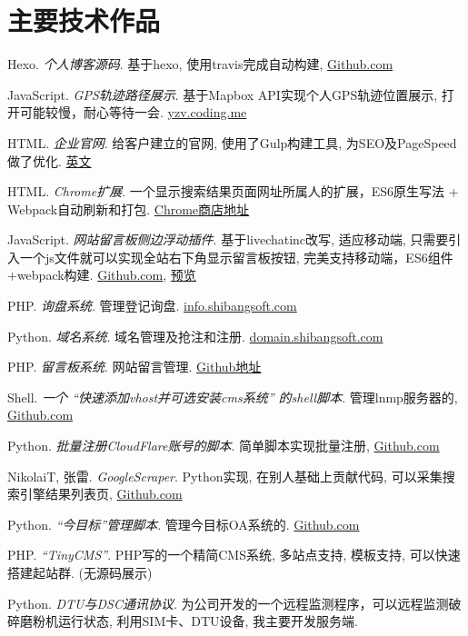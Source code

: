 
\section{\textbf{主要技术作品}}
 \resumeSubHeadingListStart
    \item{
       Hexo.
       \emph{个人博客源码}.
       基于hexo, 使用travis完成自动构建, \href{https://github.com/sbmzhcn/sbmzhcn.github.io/tree/source}{Github.com}
   }
   \item{
       JavaScript.
       \emph{GPS轨迹路径展示}.
       基于Mapbox API实现个人GPS轨迹位置展示, 打开可能较慢，耐心等待一会. \href{http://yzv.coding.me/#portfolio/portfolio-4}{yzv.coding.me}
   }
   \item{
       HTML.
       \emph{企业官网}.
       给客户建立的官网, 使用了Gulp构建工具, 为SEO及PageSpeed做了优化. \href{https://www.kamychina.com/}{英文}
   }
   \item{
       HTML.
       \emph{Chrome扩展}.
       一个显示搜索结果页面网址所属人的扩展，ES6原生写法 + Webpack自动刷新和打包. \href{https://chrome.google.com/webstore/detail/ifbiiojnbgljbjffmacihhdkeomdkifc}{Chrome商店地址}
   }
   \item{
       JavaScript.
       \emph{网站留言板侧边浮动插件}.
       基于livechatinc改写, 适应移动端, 只需要引入一个js文件就可以实现全站右下角显示留言板按钮, 完美支持移动端，ES6组件+webpack构建. \href{https://github.com/sbmzhcn/sbmzhcn.github.io/tree/master/livechat}{Github.com},
       \href{https://www.kamychina.com/}{预览}
   }
   \item{
       PHP.
       \emph{询盘系统}.
       管理登记询盘. \href{http://info.shibangsoft.com}{info.shibangsoft.com}
   }
   \item{
       Python.
       \emph{域名系统}.
       域名管理及抢注和注册. \href{http://domain.shibangsoft.com}{domain.shibangsoft.com}
   }
   \item{
       PHP.
       \emph{留言板系统}.
       网站留言管理.  \href{https://github.com/sbmzhcn/inquiry}{Github地址}
   }
   \item{
       Shell.
       \emph{一个 ``快速添加vhost并可选安装cms系统'' 的shell脚本}.
       管理lnmp服务器的, \href{https://github.com/sbmzhcn/Tools}{Github.com}
   }
   \item{
       Python.
       \emph{批量注册CloudFlare账号的脚本}.
       简单脚本实现批量注册, \href{https://github.com/sbmzhcn/cloudflare}{Github.com}
   }
   \item{
       NikolaiT, 张雷.
       \emph{GoogleScraper}.
       Python实现, 在别人基础上贡献代码, 可以采集搜索引擎结果列表页, \href{https://github.com/NikolaiT/GoogleScraper/blob/master/AUTHORS}{Github.com}
   }
   \item{
       Python.
       \emph{``今目标''管理脚本}.
       管理今目标OA系统的. \href{https://github.com/sbmzhcn/Jingoal}{Github.com}
   }
   \item{
       PHP.
       \emph{``TinyCMS''}.
       PHP写的一个精简CMS系统, 多站点支持, 模板支持, 可以快速搭建起站群. (无源码展示)
   }
   \item{
       Python.
       \emph{DTU与DSC通讯协议}.
       为公司开发的一个远程监测程序，可以远程监测破碎磨粉机运行状态, 利用SIM卡、DTU设备, 我主要开发服务端.
   }

 \resumeSubHeadingListEnd
